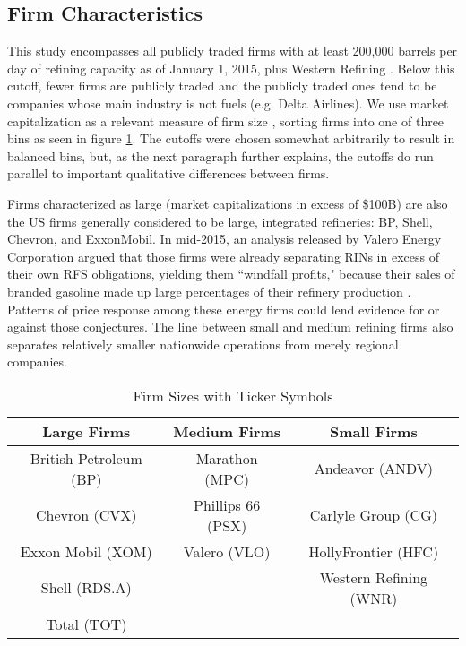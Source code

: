 \documentclass[11pt]{article}
\begin{document}
\subsection{Firm Characteristics}\label{sec_firmcharacter}
This study encompasses all publicly traded firms with at least 200,000 barrels per day of refining capacity as of January 1, 2015, plus Western Refining \citep{EnergyInformationAdministration2015}. Below this cutoff, fewer firms are publicly traded and the publicly traded ones tend to be companies whose main industry is not fuels (e.g. Delta Airlines). We use market capitalization as a relevant measure of firm size \citep{Fama1992}, sorting firms into one of three bins as seen in figure \ref{bins}. The cutoffs were chosen somewhat arbitrarily to result in balanced bins, but, as the next paragraph further explains, the cutoffs do run parallel to important qualitative differences between firms.

Firms characterized as large (market capitalizations in excess of \$100B) are also the US firms generally considered to be large, integrated refineries: BP, Shell, Chevron, and ExxonMobil. In mid-2015, an analysis released by Valero Energy Corporation argued that those firms were already separating RINs in excess of their own RFS obligations, yielding them ``windfall profits," because their sales of branded gasoline made up large percentages of their refinery production \citep{ValeroEnergyCorporation2016}. Patterns of price response among these energy firms could lend evidence for or against those conjectures. The line between small and medium refining firms also separates relatively smaller nationwide operations from merely regional companies. 

\begin{table}[h]
	\caption{Firm Sizes with Ticker Symbols}
	\label{bins}
	\centering
	
		\begin{tabular}{c c c }
			\hline
			\hline
			Large Firms		& Medium Firms	& Small Firms\\
			\hline
			British Petroleum (BP) & Marathon (MPC) & Andeavor (ANDV)\\
			Chevron (CVX) & Phillips 66 (PSX) & Carlyle Group (CG)\\
			Exxon Mobil (XOM) & Valero (VLO) & HollyFrontier (HFC)\\
			Shell (RDS.A) & & Western Refining (WNR)\\
			Total (TOT) & & \\
			\hline
			
		\end{tabular}
	
\end{table}
\end{document}
